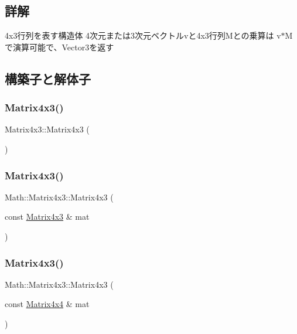 \subsection{詳解}
4x3行列を表す構造体 4次元または3次元ベクトルvと4x3行列\+Mとの乗算は v$\ast$\+Mで演算可能で、\+Vector3を返す 

\subsection{構築子と解体子}
\mbox{\label{struct_math_1_1_matrix4x3_a19639372b71d4a34a68b59fb55d01e8f}} 
\subsubsection{\texorpdfstring{Matrix4x3()}{Matrix4x3()}\hspace{0.1cm}{\footnotesize\ttfamily [1/4]}}
{\footnotesize\ttfamily Matrix4x3\+::\+Matrix4x3 (\begin{DoxyParamCaption}{ }\end{DoxyParamCaption})}

\mbox{\label{struct_math_1_1_matrix4x3_a8c6caa8ec7d8be40c2316f922de72cc3}} 
\subsubsection{\texorpdfstring{Matrix4x3()}{Matrix4x3()}\hspace{0.1cm}{\footnotesize\ttfamily [2/4]}}
{\footnotesize\ttfamily Math\+::\+Matrix4x3\+::\+Matrix4x3 (\begin{DoxyParamCaption}\item[{const \mbox{\hyperlink{struct_math_1_1_matrix4x3}{Matrix4x3}} \&}]{mat }\end{DoxyParamCaption})}

\mbox{\label{struct_math_1_1_matrix4x3_a7036833e9643c5ffa558823fdb9c1ae8}} 
\subsubsection{\texorpdfstring{Matrix4x3()}{Matrix4x3()}\hspace{0.1cm}{\footnotesize\ttfamily [3/4]}}
{\footnotesize\ttfamily Math\+::\+Matrix4x3\+::\+Matrix4x3 (\begin{DoxyParamCaption}\item[{const \mbox{\hyperlink{struct_math_1_1_matrix4x4}{Matrix4x4}} \&}]{mat }\end{DoxyParamCaption})}

